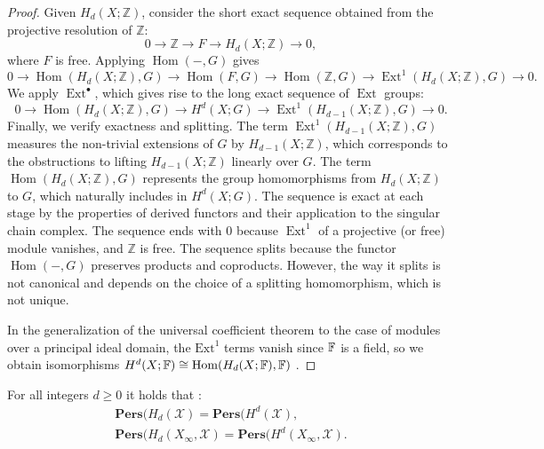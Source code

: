 \begin{proof}
	Given $H_{d}(X; \mathbb{Z})$, consider the short exact sequence obtained from the
	projective resolution of $\mathbb{Z}$:
	\[
		0 \rightarrow \mathbb{Z}\rightarrow F \rightarrow H_{d}(X; \mathbb{Z}) \rightarrow
		0,
	\]
	where $F$ is free. Applying $\operatorname{Hom}(-, G)$ gives
	\[
		0 \rightarrow \operatorname{Hom}(H_{d}(X; \mathbb{Z}), G) \rightarrow \operatorname{Hom}
		(F, G) \rightarrow \operatorname{Hom}(\mathbb{Z}, G) \rightarrow \operatorname{Ext}
		^{1}(H_{d}(X; \mathbb{Z}), G) \rightarrow 0.
	\]
	We apply $\operatorname{Ext}^{\bullet}$, which gives rise to the long exact
	sequence of $\operatorname{Ext}$ groups:
	\[
		0 \rightarrow \operatorname{Hom}(H_{d}(X; \mathbb{Z}), G) \rightarrow H^{d}(X
		; G) \rightarrow \operatorname{Ext}^{1}(H_{d-1}(X; \mathbb{Z}), G) \rightarrow
		0.
	\]
	Finally, we verify exactness and splitting. The term $\operatorname{Ext}^{1}(H_{d-1}
	(X; \mathbb{Z}), G)$ measures the non-trivial extensions of $G$ by $H_{d-1}(X;
	\mathbb{Z})$, which corresponds to the obstructions to lifting
	$H_{d-1}(X; \mathbb{Z})$ linearly over $G$. The term $\operatorname{Hom}(H_{d}(
	X; \mathbb{Z}), G)$ represents the group homomorphisms from $H_{d}(X; \mathbb{Z}
	)$ to $G$, which naturally includes in $H^{d}(X; G)$. The sequence is exact at
	each stage by the properties of derived functors and their application to the singular
	chain complex. The sequence ends with $0$ because $\operatorname{Ext}^{1}$ of
	a projective (or free) module vanishes, and $\mathbb{Z}$ is free. The sequence
	splits because the functor $\operatorname{Hom}(-, G)$ preserves products and
	coproducts. However, the way it splits is not canonical and depends on the
	choice of a splitting homomorphism, which is not unique.

	In the generalization of the universal coefficient theorem to the case of modules
	over a principal ideal domain, the $\text{Ext}^{1}$ terms vanish since ${\mathbb{F}}$ is
	a field, so we obtain isomorphisms $H^{d}(X;{\mathbb{F}}) \cong {\mathrm{Hom}}(H_{d}(X;{\mathbb{F}}),{\mathbb{F}})$ \cite[p.198
	§3.3.1]{hatcher2005algebraic}.
\end{proof}

\begin{theorem}
	For all integers $d \geq 0$ it holds that \cite[§2.3]{de2011dualities}:
	\begin{align*}
		\textbf{Pers}(H_{d}(\mathcal{X}) = \textbf{Pers}(H^{d}(\mathcal{X}),                         \\
		\textbf{Pers}(H_{d}(X_{\infty}, \mathcal{X}) = \textbf{Pers}(H^{d}(X_{\infty}, \mathcal{X}).
	\end{align*}
\end{theorem}

